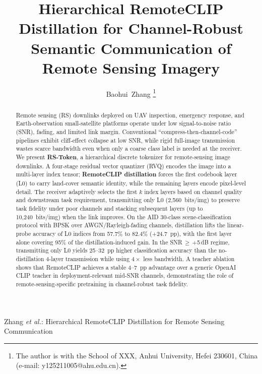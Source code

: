 \documentclass[lettersize,journal]{IEEEtran}
\begin{document}
\title{Hierarchical RemoteCLIP Distillation for Channel-Robust Semantic Communication of Remote Sensing Imagery}

\author{Baohui~Zhang%
\thanks{The author is with the School of XXX, Anhui University, Hefei 230601, China (e-mail: y125211005@ahu.edu.cn).}%
}

%
{Zhang \MakeLowercase{\textit{et al.}}: Hierarchical RemoteCLIP Distillation for Remote Sensing Communication}

\maketitle

\begin{abstract}
Remote sensing (RS) downlinks deployed on UAV inspection, emergency response, and Earth-observation small-satellite platforms operate under low signal-to-noise ratio (SNR), fading, and limited link margin. Conventional ``compress-then-channel-code'' pipelines exhibit cliff-effect collapse at low SNR, while rigid full-image transmission wastes scarce bandwidth even when only a coarse class label is needed at the receiver. We present \textbf{RS-Token}, a hierarchical discrete tokenizer for remote-sensing image downlinks. A four-stage residual vector quantizer (RVQ) encodes the image into a multi-layer index tensor; \textbf{RemoteCLIP distillation} forces the first codebook layer (L0) to carry land-cover semantic identity, while the remaining layers encode pixel-level detail. The receiver adaptively selects the first $k$ index layers based on channel quality and downstream task requirement, transmitting only L0 (2{,}560~bits/img) to preserve task fidelity under poor channels and stacking subsequent layers (up to 10{,}240~bits/img) when the link improves. On the AID 30-class scene-classification protocol with BPSK over AWGN/Rayleigh-fading channels, distillation lifts the linear-probe accuracy of L0 indices from 57.7\% to 82.4\% (+24.7~pp), with the first layer alone covering 95\% of the distillation-induced gain. In the SNR\,$\geq$\,$+$5\,dB regime, transmitting only L0 yields 25--32~pp higher classification accuracy than the no-distillation 4-layer transmission while using $4\times$ less bandwidth. A teacher ablation shows that RemoteCLIP achieves a stable 4--7~pp advantage over a generic OpenAI CLIP teacher in deployment-relevant mid-SNR channels, demonstrating the role of remote-sensing-specific pretraining in channel-robust task fidelity.
\end{abstract}
\end{document}
